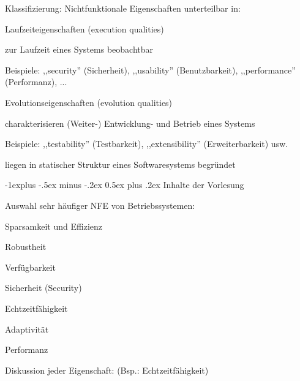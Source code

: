 \documentclass[a4paper]{article}
\makeatletter
\renewcommand{\subsection}{\@startsection{subsection}{2}{0mm}%
 {-1explus -.5ex minus -.2ex}%
 {0.5ex plus .2ex}%
 {\normalfont\normalsize\bfseries}}
\makeatother
\begin{document}
\begin{multicols}{3}
    Klassifizierung: Nichtfunktionale Eigenschaften unterteilbar in:

    \begin{enumerate*}
        \item
        Laufzeiteigenschaften (execution qualities)
        \begin{itemize*}
            \item zur Laufzeit eines Systems beobachtbar
            \item Beispiele: ,,security'' (Sicherheit), ,,usability'' (Benutzbarkeit), ,,performance'' (Performanz), ...
        \end{itemize*}
        \item
        Evolutionseigenschaften (evolution qualities)
        \begin{itemize*}
            \item charakterisieren (Weiter-) Entwicklung- und Betrieb eines Systems
            \item Beispiele: ,,testability'' (Testbarkeit), ,,extensibility'' (Erweiterbarkeit) usw.
        \end{itemize*}
    \end{enumerate*}

    \begin{itemize*}
        \item
        liegen in statischer Struktur eines Softwaresystems begründet
    \end{itemize*}


    \subsection{Inhalte der Vorlesung}

    Auswahl sehr häufiger NFE von Betriebssystemen:

    \begin{itemize*}
        \item
        Sparsamkeit und Effizienz
        \item
        Robustheit
        \item
        Verfügbarkeit
        \item
        Sicherheit (Security)
        \item
        Echtzeitfähigkeit
        \item
        Adaptivität
        \item
        Performanz
    \end{itemize*}

    Diskussion jeder Eigenschaft: (Bsp.: Echtzeitfähigkeit)


\end{multicols}
\end{document}
